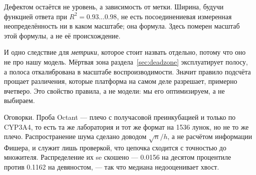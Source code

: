 Дефектом остаётся не уровень, а зависимость от метки. Ширина, будучи функцией ответа при
$R^2 = 0.93\ldots0.98$, не есть посоединениевая измеренная неопределённость ни в каком масштабе; она
формула. Здесь померен масштаб этой формулы, а не её происхождение.

И одно следствие для \emph{метрики}, которое стоит назвать отдельно, потому что оно не про нашу
модель. Мёртвая зона раздела~\ref{sec:deadzone} эксплуатирует полосу, а полоса откалибрована в
масштабе воспроизводимости. Значит правило подсчёта прощает различения, которые платформа на самом
деле разрешает, примерно вчетверо. Это свойство правила, а не модели: мы его оптимизируем, а не
выбираем.

Оговорки. Проба Octant --- плечо с получасовой преинкубацией и только по CYP3A4, то есть та же
лаборатория и тот же формат на 1536 лунок, но не то же плечо. Распространение шума сделано доводом
$\sqrt{n}/h$, а не расчётом информации Фишера, и служит лишь проверкой, что цепочка сходится с
точностью до множителя. Распределение их se скошено --- 0.0156 на десятом процентиле против 0.1162 на
девяностом, --- так что медиана недооценивает хвост.
